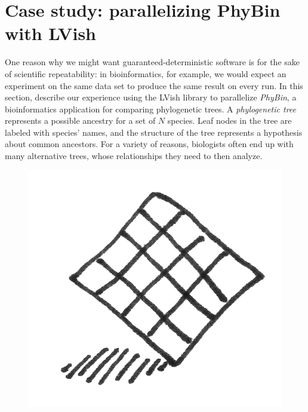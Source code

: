 \section{Case study: parallelizing PhyBin with LVish}\label{s:lvish-phybin}

One reason why we might want guaranteed-deterministic software is for
the sake of scientific repeatability: in bioinformatics, for example,
we would expect an experiment on the same data set to produce the same
result on every run.  In this section,  describe our experience using
the LVish library to parallelize \emph{PhyBin}, a bioinformatics
application for comparing phylogenetic trees.  A \emph{phylogenetic
  tree} represents a possible ancestry for a set of $N$ species.  Leaf
nodes in the tree are labeled with species' names, and the structure
of the tree represents a hypothesis about common ancestors. For a
variety of reasons, biologists often end up with many alternative
trees, whose relationships they need to then analyze.

\ifdefined\DISSERTATION
\begin{figure}
\vspace{-2em}
\begin{center}
  \includegraphics[scale=0.15]{../illustrations/matrix}
\end{center}
\vspace{-2em}
\end{figure}
\fi

